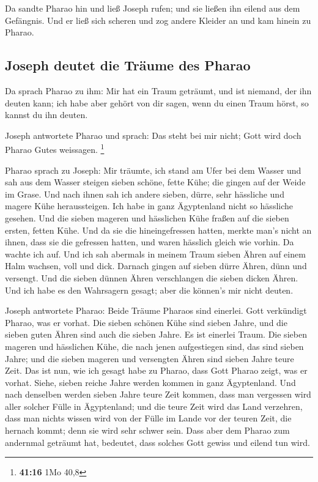  Da sandte Pharao hin und ließ Joseph rufen; und sie
ließen ihn eilend aus dem Gefängnis. Und er ließ sich scheren und zog
andere Kleider an und kam hinein zu Pharao.

\hypertarget{joseph-deutet-die-truxe4ume-des-pharao}{%
\subsection{Joseph deutet die Träume des
Pharao}\label{joseph-deutet-die-truxe4ume-des-pharao}}

 Da sprach Pharao zu ihm: Mir hat ein Traum geträumt, und
ist niemand, der ihn deuten kann; ich habe aber gehört von dir sagen,
wenn du einen Traum hörst, so kannst du ihn deuten.

 Joseph antwortete Pharao und sprach: Das steht bei mir
nicht; Gott wird doch Pharao Gutes weissagen. \footnote{\textbf{41:16}
  1Mo 40,8}

 Pharao sprach zu Joseph: Mir träumte, ich stand am Ufer
bei dem Wasser  und sah aus dem Wasser steigen sieben
schöne, fette Kühe; die gingen auf der Weide im Grase. 
Und nach ihnen sah ich andere sieben, dürre, sehr hässliche und magere
Kühe heraussteigen. Ich habe in ganz Ägyptenland nicht so hässliche
gesehen.  Und die sieben mageren und hässlichen Kühe
fraßen auf die sieben ersten, fetten Kühe.  Und da sie
die hineingefressen hatten, merkte man's nicht an ihnen, dass sie die
gefressen hatten, und waren hässlich gleich wie vorhin. Da wachte ich
auf.  Und ich sah abermals in meinem Traum sieben Ähren
auf einem Halm wachsen, voll und dick.  Darnach gingen
auf sieben dürre Ähren, dünn und versengt.  Und die
sieben dünnen Ähren verschlangen die sieben dicken Ähren. Und ich habe
es den Wahrsagern gesagt; aber die können's mir nicht deuten.

 Joseph antwortete Pharao: Beide Träume Pharaos sind
einerlei. Gott verkündigt Pharao, was er vorhat.  Die
sieben schönen Kühe sind sieben Jahre, und die sieben guten Ähren sind
auch die sieben Jahre. Es ist einerlei Traum.  Die sieben
mageren und hässlichen Kühe, die nach jenen aufgestiegen sind, das sind
sieben Jahre; und die sieben mageren und versengten Ähren sind sieben
Jahre teure Zeit.  Das ist nun, wie ich gesagt habe zu
Pharao, dass Gott Pharao zeigt, was er vorhat.  Siehe,
sieben reiche Jahre werden kommen in ganz Ägyptenland. 
Und nach denselben werden sieben Jahre teure Zeit kommen, dass man
vergessen wird aller solcher Fülle in Ägyptenland; und die teure Zeit
wird das Land verzehren,  dass man nichts wissen wird von
der Fülle im Lande vor der teuren Zeit, die hernach kommt; denn sie wird
sehr schwer sein.  Dass aber dem Pharao zum andernmal
geträumt hat, bedeutet, dass solches Gott gewiss und eilend tun wird.

